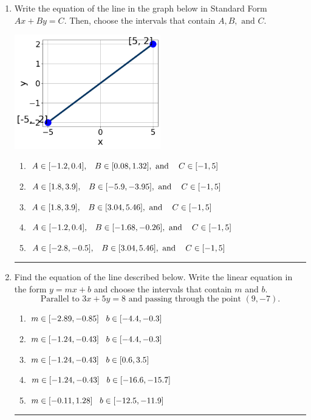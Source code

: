 \documentclass[14pt]{extbook}
\newcommand{\litem}[1]{\item#1\hspace*{-1cm}\rule{\textwidth}{0.4pt}}
\begin{document}
\begin{enumerate}
{\begin{enumerate}[label=\Alph*.]
\end{enumerate} }
\litem{
Write the equation of the line in the graph below in Standard Form $Ax+By=C$. Then, choose the intervals that contain $A, B, \text{ and } C$.
\begin{center}
    \includegraphics[width=0.5\textwidth]{../Figures/linearGraphToStandardC.png}
\end{center}
\begin{enumerate}[label=\Alph*.]
\item \( A \in [-1.2, 0.4], \hspace{3mm} B \in [0.08, 1.32], \text{ and } \hspace{3mm} C \in [-1, 5] \)
\item \( A \in [1.8, 3.9], \hspace{3mm} B \in [-5.9, -3.95], \text{ and } \hspace{3mm} C \in [-1, 5] \)
\item \( A \in [1.8, 3.9], \hspace{3mm} B \in [3.04, 5.46], \text{ and } \hspace{3mm} C \in [-1, 5] \)
\item \( A \in [-1.2, 0.4], \hspace{3mm} B \in [-1.68, -0.26], \text{ and } \hspace{3mm} C \in [-1, 5] \)
\item \( A \in [-2.8, -0.5], \hspace{3mm} B \in [3.04, 5.46], \text{ and } \hspace{3mm} C \in [-1, 5] \)

\end{enumerate} }
\litem{
Find the equation of the line described below. Write the linear equation in the form $ y=mx+b $ and choose the intervals that contain $m$ and $b$.\[ \text{Parallel to } 3 x + 5 y = 8 \text{ and passing through the point } (9, -7). \]\begin{enumerate}[label=\Alph*.]
\item \( m \in [-2.89, -0.85] \hspace*{3mm} b \in [-4.4, -0.3] \)
\item \( m \in [-1.24, -0.43] \hspace*{3mm} b \in [-4.4, -0.3] \)
\item \( m \in [-1.24, -0.43] \hspace*{3mm} b \in [0.6, 3.5] \)
\item \( m \in [-1.24, -0.43] \hspace*{3mm} b \in [-16.6, -15.7] \)
\item \( m \in [-0.11, 1.28] \hspace*{3mm} b \in [-12.5, -11.9] \)


\end{enumerate}}
\end{enumerate}
\end{document}
